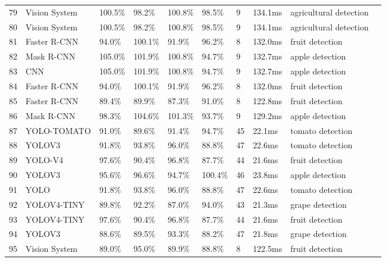 \begin{table*}[htbp]
\begin{tabular}{p{}p{}p{}p{}p{}p{}p{}p{}p{}p{}}
 79 & Vision System & 100.5\% & 98.2\% & 100.8\% & 98.5\% & 9 & 134.1ms & agricultural detection & \cite{Nguyen2022} \\
 80 & Vision System & 100.5\% & 98.2\% & 100.8\% & 98.5\% & 9 & 134.1ms & agricultural detection & \cite{Munoz2022} \\
 81 & Faster R-CNN & 94.0\% & 100.1\% & 91.9\% & 96.2\% & 8 & 132.0ms & fruit detection & \cite{wan2020faster} \\
 82 & Mask R-CNN & 105.0\% & 101.9\% & 100.8\% & 94.7\% & 9 & 132.7ms & apple detection & \cite{jia2020detection} \\
 83 & CNN & 105.0\% & 101.9\% & 100.8\% & 94.7\% & 9 & 132.7ms & apple detection & \cite{fu2020faster} \\
 84 & Faster R-CNN & 94.0\% & 100.1\% & 91.9\% & 96.2\% & 8 & 132.0ms & fruit detection & \cite{tu2020passion} \\
 85 & Faster R-CNN & 89.4\% & 89.9\% & 87.3\% & 91.0\% & 8 & 122.8ms & fruit detection & \cite{fu2018kiwifruit} \\
 86 & Mask R-CNN & 98.3\% & 104.6\% & 101.3\% & 93.7\% & 9 & 129.2ms & apple detection & \cite{chu2021deep} \\
 87 & YOLO-TOMATO & 91.0\% & 89.6\% & 91.4\% & 94.7\% & 45 & 22.1ms & tomato detection & \cite{liu2020yolo} \\
 88 & YOLOV3 & 91.8\% & 93.8\% & 96.0\% & 88.8\% & 47 & 22.6ms & tomato detection & \cite{lawal2021tomato} \\
 89 & YOLO-V4 & 97.6\% & 90.4\% & 96.8\% & 87.7\% & 44 & 21.6ms & fruit detection & \cite{gai2023detection} \\
 90 & YOLOV3 & 95.6\% & 96.6\% & 94.7\% & 100.4\% & 46 & 23.8ms & apple detection & \cite{kuznetsova2020using} \\
 91 & YOLO & 91.8\% & 93.8\% & 96.0\% & 88.8\% & 47 & 22.6ms & tomato detection & \cite{magalhaes2021evaluating} \\
 92 & YOLOV4-TINY & 89.8\% & 92.2\% & 87.0\% & 94.0\% & 43 & 21.3ms & grape detection & \cite{li2021real} \\
 93 & YOLOV4-TINY & 97.6\% & 90.4\% & 96.8\% & 87.7\% & 44 & 21.6ms & fruit detection & \cite{tang2023fruit} \\
 94 & YOLOV3 & 88.6\% & 89.5\% & 93.3\% & 88.2\% & 47 & 21.8ms & grape detection & \cite{sozzi2022automatic} \\
 95 & Vision System & 89.0\% & 95.0\% & 89.9\% & 88.8\% & 8 & 122.5ms & fruit detection & \cite{sa2016deepfruits} \\

\end{tabular}
\end{table*}
